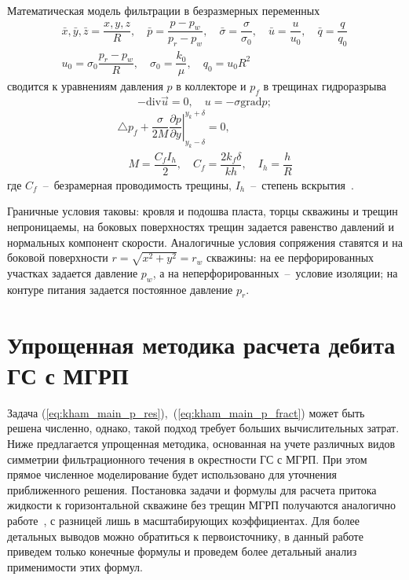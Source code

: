 \documentclass{article}
\begin{document}
Математическая модель фильтрации в безразмерных переменных
\begin{equation}
  \displaystyle
  \begin{gathered}
    \bar{x},\bar{y},\bar{z} = \dfrac{x,y,z}{R}, \quad
    \bar{p} = \dfrac{p - p_w}{p_r - p_w}, \quad
    \bar{\sigma} = \dfrac{\sigma}{\sigma_0}, \quad
    \bar{u}=\dfrac{u}{u_0},  \quad
    \bar{q} = \dfrac{q}{q_0}    \\
    u_0 = \sigma_0 \dfrac{p_r - p_w}{R}, \quad
    \sigma_0 = \dfrac{k_0}{\mu}, \quad
    q_0 = u_0 R^2
  \end{gathered}
  \label{eq:kham_dimless}
\end{equation}
сводится  к уравнениям  давления $p$ в коллекторе и $p_f$ в трещинах гидроразрыва~\cite{ref:kham_mazo_uzku_2015}
\begin{equation}
  \displaystyle
  - \text{div} \vec{u} = 0, \quad u=-\sigma \text{grad} p;
  \label{eq:kham_main_p_res}
\end{equation}
\begin{equation}
  \displaystyle
  \begin{gathered}
    \triangle p_f + \dfrac{\sigma}{2M}\left.\dfrac{\partial p}{\partial y} \right|_{y_k - \delta}^{y_k + \delta} = 0, \\[8pt]
    \quad M = \dfrac{C_f I_h}{2}, \quad C_f = \dfrac{2 k_f \delta}{k h}, \quad I_h=\dfrac{h}{R}
  \end{gathered}
  \label{eq:kham_main_p_fract}
\end{equation}
где $C_f$~--~безрамерная проводимость трещины, $I_h$~--~степень вскрытия~\cite{lit:kham_valko_economides_2001}.

Граничные условия таковы: кровля и подошва пласта, торцы скважины и трещин непроницаемы, на боковых поверхностях трещин задается равенство давлений и нормальных компонент скорости. Аналогичные условия сопряжения ставятся и на боковой поверхности $r=\sqrt{x^2 + y^2} = r_w$ скважины: на ее перфорированных участках задается давление $p_w$, а на неперфорированных~--~условие изоляции; на контуре питания задается постоянное давление $p_r$.

\section{Упрощенная методика расчета дебита ГС с МГРП}
Задача (\ref{eq:kham_main_p_res}),~(\ref{eq:kham_main_p_fract}) может быть решена численно, однако, такой подход требует больших вычислительных затрат. Ниже предлагается упрощенная методика, основанная на учете различных видов симметрии фильтрационного течения в окрестности ГС с МГРП. При этом прямое численное моделирование будет использовано для уточнения приближенного решения.
Постановка задачи и формулы для расчета притока жидкости к горизонтальной скважине без трещин МГРП получаются аналогично работе~\cite{ref:kham_mazo_uzku_2015}, с разницей лишь в масштабирующих коэффициентах. Для более детальных выводов можно обратиться к первоисточнику, в данный работе приведем только конечные формулы и проведем более детальный анализ применимости этих формул.
\end{document}
